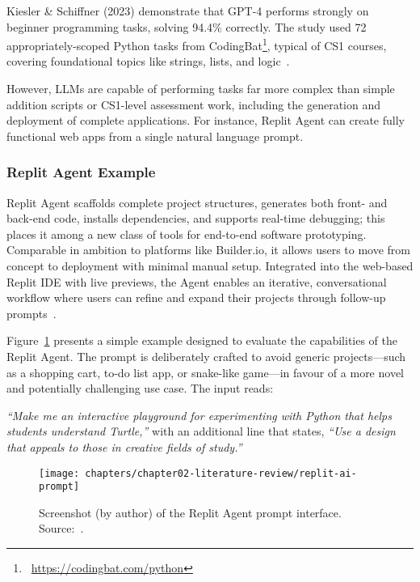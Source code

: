 Kiesler \& Schiffner (2023) demonstrate that GPT-4 performs strongly on beginner programming tasks, solving 94.4\% correctly. The study used 72 appropriately-scoped Python tasks from CodingBat\footnote{~\url{https://codingbat.com/python}}, typical of CS1 courses, covering foundational topics like strings, lists, and logic~\cite{kiesler_large_2023}. 

However, LLMs are capable of performing tasks far more complex than simple addition scripts or CS1-level assessment work, including the generation and deployment of complete applications. For instance, Replit Agent can create fully functional web apps from a single natural language prompt.

\subsubsection{Replit Agent Example}

Replit Agent scaffolds complete project structures, generates both front- and back-end code, installs dependencies, and supports real-time debugging; this places it among a new class of tools for end-to-end software prototyping. Comparable in ambition to platforms like Builder.io, it allows users to move from concept to deployment with minimal manual setup. Integrated into the web-based Replit IDE with live previews, the Agent enables an iterative, conversational workflow where users can refine and expand their projects through follow-up prompts~\cite{replit_inc_replit_2025}.

Figure~\ref{fig:replit-ai-prompt} presents a simple example designed to evaluate the capabilities of the Replit Agent. The prompt is deliberately crafted to avoid generic projects---such as a shopping cart, to-do list app, or snake-like game---in favour of a more novel and potentially challenging use case. The input reads:

\textit{``Make me an interactive playground for experimenting with Python that helps students understand Turtle,''} with an additional line that states, \textit{``Use a design that appeals to those in creative fields of study.''}

\begin{figure}[!htbp]
\centering
\texttt{[image: chapters/chapter02-literature-review/replit-ai-prompt]}
\caption{Screenshot (by author) of the Replit Agent prompt interface. Source:~\cite{replit_inc_replit_2025-1}.}
\label{fig:replit-ai-prompt}
\end{figure}

